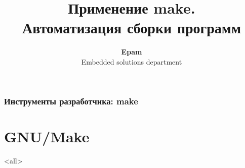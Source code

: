 \documentclass[ignorenonframetext, professionalfonts, hyperref={pdftex, unicode}]{beamer}
\title[make]{Применение make.\\Автоматизация сборки программ}
\author[Epam]{{\bf Epam}\\Embedded solutions department}
\begin{document}



\begin{frame}
	\frametitle{Инструменты разработчика: make}
	\titlepage
	\vspace{-0.5cm}
	\begin{center}
	\end{center}
\end{frame}

\begin{frame}
	\tableofcontents
\end{frame}



\section{GNU/Make}

\mode<all>{}
\end{document}

